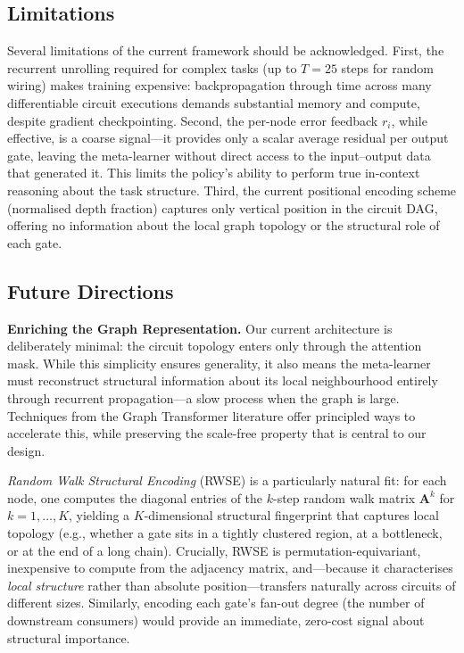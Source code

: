 \subsection*{Limitations}

Several limitations of the current framework should be acknowledged. First, the recurrent unrolling required for complex tasks (up to $T=25$ steps for random wiring) makes training expensive: backpropagation through time across many differentiable circuit executions demands substantial memory and compute, despite gradient checkpointing. Second, the per-node error feedback $r_i$, while effective, is a coarse signal---it provides only a scalar average residual per output gate, leaving the meta-learner without direct access to the input--output data that generated it. This limits the policy's ability to perform true in-context reasoning about the task structure. Third, the current positional encoding scheme (normalised depth fraction) captures only vertical position in the circuit DAG, offering no information about the local graph topology or the structural role of each gate.

\subsection*{Future Directions}

\textbf{Enriching the Graph Representation.}
Our current architecture is deliberately minimal: the circuit topology enters only through the attention mask. While this simplicity ensures generality, it also means the meta-learner must reconstruct structural information about its local neighbourhood entirely through recurrent propagation---a slow process when the graph is large. Techniques from the Graph Transformer literature offer principled ways to accelerate this, while preserving the scale-free property that is central to our design.

\textit{Random Walk Structural Encoding} (RWSE) \citep{dwivedi2021generalizationtransformernetworksgraphs} is a particularly natural fit: for each node, one computes the diagonal entries of the $k$-step random walk matrix $\mathbf{A}^k$ for $k = 1, \dots, K$, yielding a $K$-dimensional structural fingerprint that captures local topology (e.g., whether a gate sits in a tightly clustered region, at a bottleneck, or at the end of a long chain). Crucially, RWSE is permutation-equivariant, inexpensive to compute from the adjacency matrix, and---because it characterises \textit{local structure} rather than absolute position---transfers naturally across circuits of different sizes. Similarly, encoding each gate's fan-out degree (the number of downstream consumers) would provide an immediate, zero-cost signal about structural importance.

